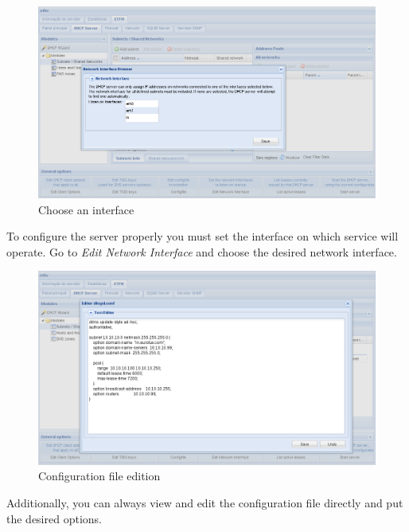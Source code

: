 \begin{figure}[H]
    \begin{center}
    \includegraphics[scale=0.38]{screenshots/etfw/etfw_dhcp_interfaces_01.png}
    \caption{Choose an interface}
    \label{fig:etfw_dhcp_interfaces_01}
    \end{center}
\end{figure}

To configure the server properly you must set the interface on which service will operate.
Go to \textit{Edit Network Interface} and choose the desired network interface.

\begin{figure}[H]
    \begin{center}
    \includegraphics[scale=0.38]{screenshots/etfw/etfw_dhcp_texteditor_01.png}
    \caption{Configuration file edition}
    \label{fig:etfw_dhcp_texteditor_01}
    \end{center}
\end{figure}

Additionally, you can always view and edit the configuration file directly and put the desired options.

